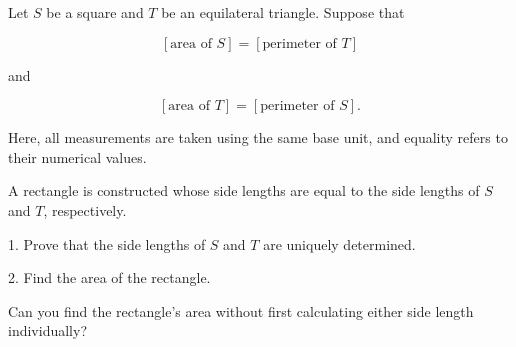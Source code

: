 Let $S$ be a square and $T$ be an equilateral triangle. Suppose that

\[
[\text{area of }S]=[\text{perimeter of }T]
\]

and

\[
[\text{area of }T]=[\text{perimeter of }S].
\]

Here, all measurements are taken using the same base unit, and equality refers to their numerical values.

A rectangle is constructed whose side lengths are equal to the side lengths of $S$ and $T$, respectively.

1. Prove that the side lengths of $S$ and $T$ are uniquely determined.

2. Find the area of the rectangle.

Can you find the rectangle's area without first calculating either side length individually?
